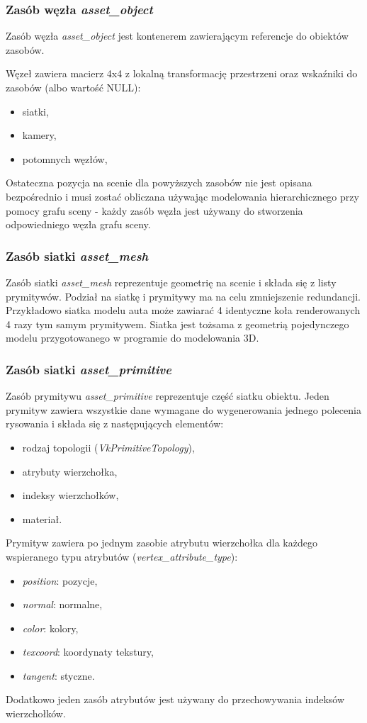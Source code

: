 \subsubsection{Zasób węzła \textit{asset\_object}}
Zasób węzła \textit{asset\_object} jest kontenerem zawierającym referencje do obiektów zasobów.

Węzeł zawiera macierz 4x4 z lokalną transformację przestrzeni oraz wskaźniki do zasobów (albo wartość NULL):
\begin{itemize}
	\item siatki,
	\item kamery,
	\item potomnych węzłów,
\end{itemize}
Ostateczna pozycja na scenie dla powyższych zasobów nie jest opisana bezpośrednio i musi zostać obliczana używając modelowania hierarchicznego przy pomocy grafu sceny - każdy zasób węzła jest używany do stworzenia odpowiedniego węzła grafu sceny.

\subsubsection{Zasób siatki \textit{asset\_mesh}}
Zasób siatki \textit{asset\_mesh} reprezentuje geometrię na scenie i składa się z listy prymitywów.
Podział na siatkę i prymitywy ma na celu zmniejszenie redundancji. Przykładowo siatka modelu auta może zawiarać 4 identyczne koła renderowanych 4 razy tym samym prymitywem.
Siatka jest tożsama z geometrią pojedynczego modelu przygotowanego w programie do modelowania 3D.

\subsubsection{Zasób siatki \textit{asset\_primitive}}
Zasób prymitywu \textit{asset\_primitive} reprezentuje część siatku obiektu.
Jeden prymityw zawiera wszystkie dane wymagane do wygenerowania jednego polecenia rysowania i składa się z następujących elementów:
\begin{itemize}
	\item rodzaj topologii (\textit{VkPrimitiveTopology}),
	\item atrybuty wierzchołka,
	\item indeksy wierzchołków,
	\item materiał.
\end{itemize}

Prymityw zawiera po jednym zasobie atrybutu wierzchołka dla każdego wspieranego typu atrybutów (\textit{vertex\_attribute\_type}):
\begin{itemize}
	\item \textit{position}: pozycje,
	\item \textit{normal}: normalne,
	\item \textit{color}: kolory,
	\item \textit{texcoord}: koordynaty tekstury,
	\item \textit{tangent}: styczne.
\end{itemize}
Dodatkowo jeden zasób atrybutów jest używany do przechowywania indeksów wierzchołków.

